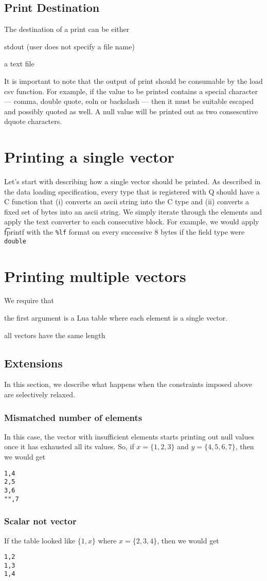 \documentclass[letterpaper]{article}
\begin{document}
\subsection{Print Destination}

The destination of a print can be either 
\be
\item stdout (user does not specify a file name)
\item a text file 
\ee

It is important to note that the output of print should be consumable by the
load csv function. For example, if the value to be printed contains a special
character --- comma, double quote, eoln or backslash --- then it must be
suitable escaped and possibly quoted as well. A null value will be printed out
as two consescutive dquote characters.

\section{Printing a single vector}
\label{single_vector}

Let's start with describing how a single vector should be printed. As
described in the data loading specification, every type that is
registered with Q should have a C function that (i) converts an ascii
string into the C type and (ii) converts a fixed set of bytes into an ascii
string. We simply iterate through the elements and apply the text converter to
each consecutive block. For example, we would apply {\t fprintf} with the
\verb+%lf+ format on every successive 8 bytes if the field type were
{\tt double}

\section{Printing multiple vectors}
\label{multiple_vectors}

We require that 
\be
\item 
the first argument is a Lua table where each element is a single vector. 
\item all vectors have the same length
\ee

\subsection{Extensions}
In this section, we describe what happens when the constraints imposed above are
selectively relaxed.
\subsubsection{Mismatched number of elements}
In this case, the vector with insufficient elements starts printing out null
values once it has exhausted all its values. So, if \(x = \{1, 2,3\}\) and \(y
= \{4, 5, 6, 7\}\), then we would get
\begin{verbatim}
1,4
2,5
3,6
"",7
\end{verbatim}

\subsubsection{Scalar not vector}
If the table looked like \(\{1, x\}\) where \(x = \{2, 3, 4 \}\), then we would
get
\begin{verbatim}
1,2
1,3
1,4
\end{verbatim}
\end{document}
